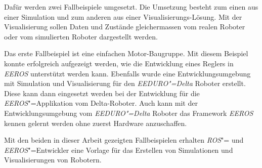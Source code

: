 Dafür werden zwei Fallbeispiele umgesetzt.
Die Umsetzung besteht zum einen aus einer Simulation und zum anderen aus einer Visualisierungs-Lösung.
Mit der Visualisierung sollen Daten und Zustände gleichermassen vom realen Roboter oder vom simulierten Roboter dargestellt werden.


Das erste Fallbeispiel ist eine einfachen Motor-Baugruppe.
Mit diesem Beispiel konnte erfolgreich aufgezeigt werden, wie die Entwicklung eines Reglers in \textit{EEROS} unterstützt werden kann.
Ebenfalls wurde eine Entwicklungsumgebung mit Simulation und Visualisierung für den \textit{EEDURO"=Delta} Roboter erstellt.
Diese kann dann eingesetzt werden bei der Entwicklung für die  \textit{EEROS}"=Applikation vom Delta-Roboter.
Auch kann mit der Entwicklungsumgebung vom \textit{EEDURO"=Delta} Roboter das Framework \textit{EEROS} kennen gelernt werden ohne zuerst Hardware anzuschaffen.


Mit den beiden in dieser Arbeit gezeigten Fallbeispielen erhalten \textit{ROS}"= und \textit{EEROS}"=Entwickler eine Vorlage für das Erstellen von Simulationen und Visualisierungen von Robotern.

